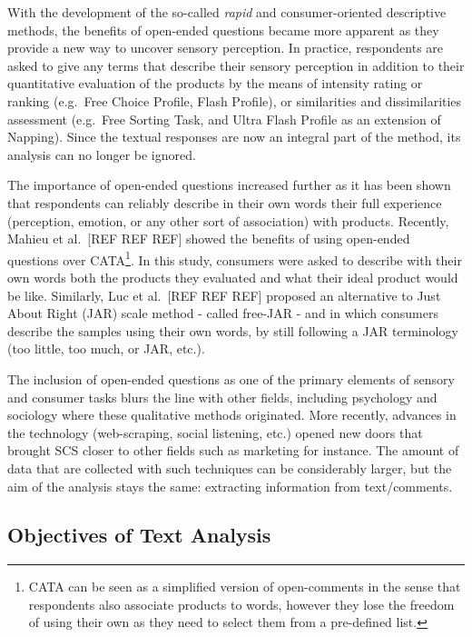\documentclass[
]{krantz}
\begin{document}
With the development of the so-called \emph{rapid} and consumer-oriented descriptive methods, the benefits of open-ended questions became more apparent as they provide a new way to uncover sensory perception. In practice, respondents are asked to give any terms that describe their sensory perception in addition to their quantitative evaluation of the products by the means of intensity rating or ranking (e.g.~Free Choice Profile, Flash Profile), or similarities and dissimilarities assessment (e.g.~Free Sorting Task, and Ultra Flash Profile as an extension of Napping). Since the textual responses are now an integral part of the method, its analysis can no longer be ignored.

The importance of open-ended questions increased further as it has been shown that respondents can reliably describe in their own words their full experience (perception, emotion, or any other sort of association) with products. Recently, Mahieu et al.~{[}REF REF REF{]} showed the benefits of using open-ended questions over CATA\footnote{CATA can be seen as a simplified version of open-comments in the sense that respondents also associate products to words, however they lose the freedom of using their own as they need to select them from a pre-defined list.}. In this study, consumers were asked to describe with their own words both the products they evaluated and what their ideal product would be like. Similarly, Luc et al.~{[}REF REF REF{]} proposed an alternative to Just About Right (JAR) scale method - called free-JAR - and in which consumers describe the samples using their own words, by still following a JAR terminology (too little, too much, or JAR, etc.).

The inclusion of open-ended questions as one of the primary elements of sensory and consumer tasks blurs the line with other fields, including psychology and sociology where these qualitative methods originated. More recently, advances in the technology (web-scraping, social listening, etc.) opened new doors that brought SCS closer to other fields such as marketing for instance. The amount of data that are collected with such techniques can be considerably larger, but the aim of the analysis stays the same: extracting information from text/comments.

\hypertarget{objectives-of-text-analysis}{%
\subsection{Objectives of Text Analysis}\label{objectives-of-text-analysis}}
\end{document}
